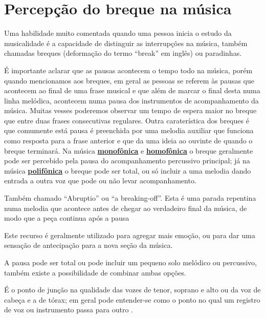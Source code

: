 \section{Percepção do breque na música}
\label{sec:percepcionbreak}

Uma habilidade muito comentada quando uma pessoa inicia o estudo da musicalidade 
é a capacidade de distinguir as interrupções na música, 
também chamadas breques (deformação do termo ``break'' em inglês) ou paradinhas.

É importante aclarar que as pausas acontecem o tempo todo na  música,
porém quando mencionamos aos breques, 
em geral as pessoas se referem às pausas que acontecem ao final de uma frase musical 
e que além de marcar o final desta numa linha melódica,
acontecem numa pausa dos instrumentos de acompanhamento da música.
Muitas vesses poderemos observar um tempo de espera maior no breque que entre duas frases consecutivas regulares.
Outra caraterística dos breques é que comumente está pausa é preenchida por uma melodia auxiliar 
que funciona como resposta para a frase anterior e que da uma ideia ao ouvinte de quando o breque terminará.
Na música \hyperref[subsec:monofonica]{\textbf{monofônica}} e \hyperref[subsec:homofonica]{\textbf{homofônica}} 
o breque geralmente pode ser percebido pela pausa do acompanhamento percussivo principal;
já na música \hyperref[subsec:polifonica]{\textbf{polifônica}} o breque pode ser total,
ou só incluir a uma melodia dando entrada a outra voz que pode ou não levar acompanhamento.
\begin{definition}[Breque]
\label{def:breakingoff}  
Também chamado ``Abruptio'' ou ``a breaking-off''. 
Esta é uma parada repentina numa melodia que acontece antes de chegar ao verdadeiro final da música, 
de modo que a peça continua após a pausa \cite[pp. 5]{baker1895dictionary}

Este recurso é geralmente utilizado para agregar mais emoção,
ou para dar uma sensação de antecipação para a nova seção da música. 

A pausa pode ser total ou pode incluir um pequeno solo melódico ou percussivo, 
também existe a possibilidade de combinar ambas opções.

\end{definition}

\begin{definition}[Break]
É o ponto de junção na qualidade das vozes de tenor, soprano e alto
ou da voz de cabeça e a de tórax;  
em geral pode entender-se como o ponto no qual um registro de voz ou instrumento passa para outro 
\cite[pp. 63]{stainer2009dictionary} \cite[pp. 31]{baker1895dictionary}.
\end{definition}

